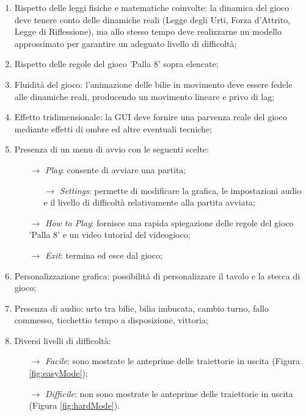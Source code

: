 \documentclass[12pt,a4paper]{report}
\begin{document}
\begin{enumerate}
    \item Rispetto delle leggi fisiche e matematiche coinvolte: la dinamica del gioco deve tenere conto delle dinamiche reali (Legge degli Urti, Forza d'Attrito, Legge di Riflessione), ma allo stesso tempo deve realizzarne un modello approssimato per garantire un adeguato livello di difficoltà;
    \item Rispetto delle regole del gioco 'Palla 8' sopra elencate;
    \item Fluidità del gioco: l'animazione delle bilie in movimento deve essere fedele alle dinamiche reali, producendo un movimento lineare e privo di lag;
    \item Effetto tridimensionale: la GUI deve fornire una parvenza reale del gioco mediante effetti di ombre ed altre eventuali tecniche;
    \item Presenza di un menu di avvio con le seguenti scelte:
    \begin{itemize}
        \item[$\rightarrow$] \emph{Play}: consente di avviare una partita;
        \begin{itemize}
        	\item[$\rightarrow$] \emph{Settings}: permette di modificare la grafica, le impostazioni audio e il livello di difficoltà relativamente alla partita avviata;
        \end{itemize}
        \item[$\rightarrow$] \emph{How to Play}: fornisce una rapida spiegazione delle regole del gioco 'Palla 8' e un video tutorial del videogioco;
        \item[$\rightarrow$] \emph{Exit}: termina ed esce dal gioco;
    \end{itemize}
    \item Personalizzazione grafica: possibilità di personalizzare il tavolo e la stecca di gioco;
    \item Presenza di audio: urto tra bilie, bilia imbucata, cambio turno, fallo commesso, ticchettio tempo a disposizione, vittoria;
   	\pagebreak
    \item Diversi livelli di difficoltà:
    \begin{itemize}
        \item[$\rightarrow$] \emph{Facile}: sono mostrate le anteprime delle traiettorie in uscita (Figura \ref{fig:easyMode});
        \item[$\rightarrow$] \emph{Difficile}: non sono mostrate le anteprime delle traiettorie in uscita (Figura \ref{fig:hardMode}).
    \end{itemize}
\end{enumerate}
\end{document}
